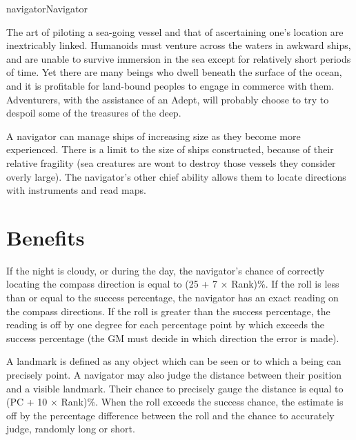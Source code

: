 \begin{Skill}[1.1]{navigator}{Navigator}

The art of piloting a sea-going vessel and that of ascertaining one’s
location are inextricably linked.  Humanoids must venture across the
waters in awkward ships, and are unable to survive immersion in the
sea except for relatively short periods of time. Yet there are many
beings who dwell beneath the surface of the ocean, and it is
profitable for land-bound peoples to engage in commerce with
them. Adventurers, with the assistance of an Adept, will probably
choose to try to despoil some of the treasures of the deep.

A navigator can manage ships of increasing size as they become more
experienced. There is a limit to the size of ships constructed,
because of their relative fragility (sea creatures are wont to destroy
those vessels they consider overly large).  The navigator’s other
chief ability allows them to locate directions with instruments and
read maps.

\section{Benefits}


If the night is cloudy, or during the day, the navigator’s chance of
correctly locating the compass direction is equal to (25 + 7 ×
Rank)\%.  If the roll is less than or equal to the success percentage,
the navigator has an exact reading on the compass directions.  If the
roll is greater than the success percentage, the reading is off by one
degree for each percentage point by which exceeds the success
percentage (the GM must decide in which direction the error is made).


A landmark is defined as any object which can be seen or to which a
being can precisely point.  A navigator may also judge the distance
between their position and a visible landmark. Their chance to
precisely gauge the distance is equal to (PC + 10 × Rank)\%.  When the
roll exceeds the success chance, the estimate is off by the percentage
difference between the roll and the chance to accurately judge,
randomly long or short.



\end{Skill}
